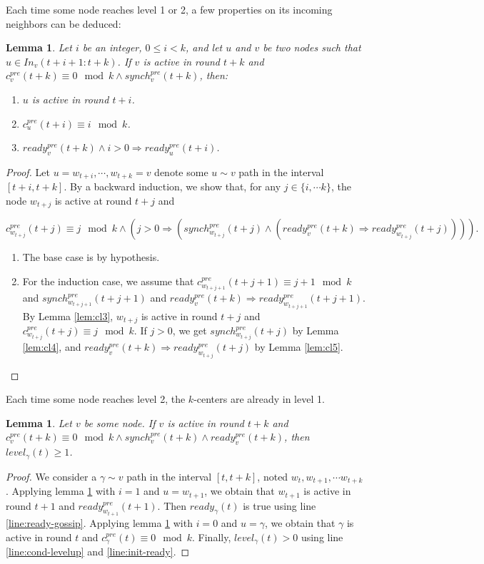 \documentclass[11pt,letterpaper]{article}
\newtheorem{lem}[thm]{Lemma}
\newcommand{\cent}{\gamma}
\begin{document}
Each time some node reaches level 1 or 2, a few properties on its incoming neighbors can be deduced:
\begin{lem} \label{lem:conc-safety}
	Let $i$ be an integer, $0 \leq i < k$, and let $u$ and $v$ be two nodes such that  $u\in In_v( t+i +1 : t+k)$.
	If $v$ is active in round $t+k$ and $c^{pre}_v(t+k) \equiv 0 \mod k \wedge synch^{pre}_v(t+k)$, then:
	\begin{enumerate}[label=\upshape(\alph*),ref=\thethm (\alph*)]
		\item\label{lem:active-path} $u$ is active in round $t+i$.
		\item $c_u^{pre}(t+i) \equiv i \mod k$.
		\item $ready_v^{pre}(t+k) \wedge i > 0 \Rightarrow ready_u^{pre}(t+i)$.
	\end{enumerate}
\end{lem}
\begin{proof}
	Let $u = w_{t+i}, \cdots, w_{t+k} = v$ denote some $u \sim v$ path in the interval $[t+i,t+k]$.
	By a backward induction, we show that, for any $j \in \{i, \cdots k\}$, the node $w_{t+j}$ is active at round $t + j$ and

	$$c_{w_{t+j}}^{pre}(t+j) \equiv j \mod k \wedge (j > 0 \Rightarrow (synch_{w_{t+j}}^{pre}(t+j) \wedge (ready_v^{pre}(t+k) \Rightarrow ready_{w_{t+j}}^{pre}(t+j)))).$$

	\begin{enumerate}
		\item The base case is by hypothesis.
		\item For the induction case, we assume that $c_{w_{t+j+1}}^{pre}(t+j+1) \equiv j+1 \mod k$ and $synch_{w_{t+j+1}}^{pre}(t+j+1)$
			and $ready_v^{pre}(t+k) \Rightarrow ready_{w_{t+j+1}}^{pre}(t+j+1)$.
			By Lemma \ref{lem:cl3}, $w_{t+j}$ is active in round $t+j$ and $c_{w_{t+j}}^{pre}(t+j) \equiv j \mod k$.
			If $j > 0$, we get $synch_{w_{t+j}}^{pre}(t+j)$ by Lemma \ref{lem:cl4},
			and $ready_v^{pre}(t+k) \Rightarrow ready_{w_{t+j}}^{pre}(t+j)$ by Lemma \ref{lem:cl5}.
	\end{enumerate}
\end{proof}

Each time some node reaches level 2, the $k$-centers are already in level 1.
\begin{lem} \label{lem:conc-safety-bis}
	Let $v$ be some node.
	If $v$ is active in round $t+k$ and $c^{pre}_v(t+k) \equiv 0 \mod k \wedge synch^{pre}_v(t+k) \wedge ready^{pre}_v(t+k)$, then
	$level_\cent(t) \geq 1$.
\end{lem}
\begin{proof}
	We consider a $\cent \sim v$ path in the interval $[t,t+k]$, noted $w_t, w_{t+1}, \cdots w_{t+k}$.
	Applying lemma \ref{lem:conc-safety} with $i = 1$ and $u = w_{t+1}$, we obtain that $w_{t+1}$ is active in round $t+1$ and $ready^{pre}_{w_{t+1}}(t+1)$.
	Then $ready_\cent(t)$ is true using line \ref{line:ready-gossip}.
	Applying lemma \ref{lem:conc-safety} with $i = 0$ and $u = \cent$, we obtain that $\cent$ is active in round $t$ and $c^{pre}_\cent(t) \equiv 0 \mod k$.
	Finally, $level_\cent(t) > 0$ using line \ref{line:cond-levelup} and \ref{line:init-ready}.
\end{proof}
\end{document}
